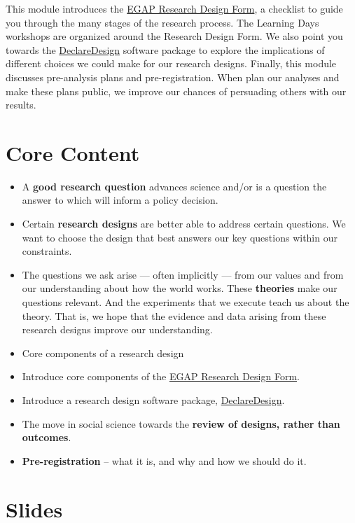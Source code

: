 \documentclass[12pt,]{book}
\begin{document}
This module introduces the \href{https://egap.github.io/learningdays-resources/Exercises/design-form.Rmd}{EGAP Research Design
Form}, a checklist to guide you through the many stages of the research process. The Learning Days workshops are organized around the Research Design Form. We also point you towards the \href{http://declaredesign.org}{DeclareDesign} software package to explore the implications of different choices we could make for our research designs. Finally, this module discusses pre-analysis plans and pre-registration. When plan our analyses and make these plans public, we improve our chances of persuading others with our results.

\hypertarget{core-content}{%
\section{Core Content}\label{core-content}}

\begin{itemize}
\item
  A \textbf{good research question} advances science and/or is a question the answer to which will inform a policy decision.
\item
  Certain \textbf{research designs} are better able to address certain questions. We want to choose the design that best answers our key questions within our constraints.
\item
  The questions we ask arise --- often implicitly --- from our values and from our understanding about how the world works. These \textbf{theories} make our questions relevant. And the experiments that we execute teach us about the theory. That is, we hope that the evidence and data arising from these research designs improve our understanding.
\item
  Core components of a research design
\item
  Introduce core components of the \href{https://egap.github.io/learningdays-resources/Exercises/design-form.html}{EGAP Research Design Form}.
\item
  Introduce a research design software package, \href{http://declaredesign.org}{DeclareDesign}.
\item
  The move in social science towards the \textbf{review of designs, rather than outcomes}.
\item
  \textbf{Pre-registration} -- what it is, and why and how we should do it.
\end{itemize}

\hypertarget{slides}{%
\section{Slides}\label{slides}}
\end{document}
